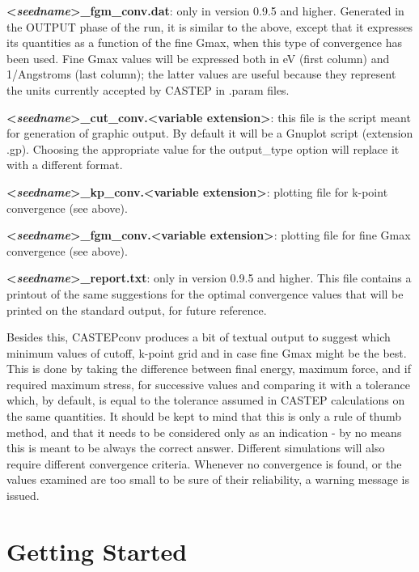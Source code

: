 \documentclass[10pt]{article}
\begin{document}
\textbf{\textless \textit{seedname}\textgreater\_fgm\_conv.dat}: only in version 0.9.5 and higher. Generated in 
the OUTPUT phase of the run, it is similar to the above, except that it 
expresses its quantities as a function of the fine Gmax, when this type of convergence has been used. Fine Gmax
values will be expressed both in eV (first column) and 1/Angstroms (last column); the latter values are useful
because they represent the units currently accepted by CASTEP in .param files.

\textbf{\textless \textit{seedname}\textgreater\_cut\_conv.\textless variable extension\textgreater}: this file is the script meant for generation of graphic 
output. By default it will be a Gnuplot script (extension .gp). Choosing the
appropriate value for the output\_type option will replace it with a different format.

\textbf{\textless \textit{seedname}\textgreater\_kp\_conv.\textless variable extension\textgreater}: plotting file for k-point convergence (see above).

\textbf{\textless \textit{seedname}\textgreater\_fgm\_conv.\textless variable extension\textgreater}: plotting file for fine Gmax convergence (see above).

\textbf{\textless \textit{seedname}\textgreater\_report.txt}: only in version
0.9.5 and higher. This file contains a printout of the same suggestions for
the optimal convergence values that will be printed on the standard output,
for future reference.

Besides this, CASTEPconv produces a bit of textual output to suggest which 
minimum values of cutoff, k-point grid and in case fine Gmax might be the best. This is done by 
taking the difference between final energy, maximum force, and if required 
maximum stress, for successive values and comparing it with a tolerance which, 
by default, is equal to the tolerance assumed in CASTEP calculations on the same 
quantities. It should be kept to mind that this is only a rule of thumb method, 
and that it needs to be considered only as an indication - by no means this is 
meant to be always the correct answer. Different simulations will also require 
different convergence criteria. Whenever no convergence is found, or the values 
examined are too small to be sure of their reliability, a warning message is 
issued.

\section{Getting Started}
\end{document}
